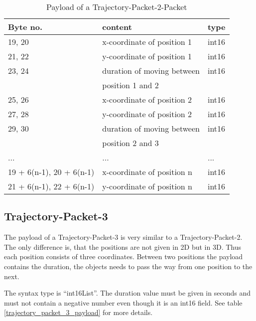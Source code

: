\begin{table}[htdp]
 \begin{center}
    \begin{tabular}{l|l|l}
      \textbf{Byte no.} & \textbf{content} & \textbf{type} \\
      \hline
      \hline
      19, 20 & x-coordinate of position 1 & int16 \\
      \hline
      21, 22 & y-coordinate of position 1 & int16 \\
      \hline
      23, 24 & duration of moving between & int16\\
      & position 1 and 2 & \\
      \hline
      25, 26 & x-coordinate of position 2 & int16 \\
      \hline
      27, 28 & y-coordinate of position 2 & int16 \\
      \hline
      29, 30 & duration of moving between & int16 \\
      &  position 2 and 3 & \\
      \hline
      ... & ... & ... \\
      \hline
      19 + 6(n-1), 20 + 6(n-1) & x-coordinate of position n & int16 \\
      \hline
      21 + 6(n-1), 22 + 6(n-1) & y-coordinate of position n & int16 \\
      \hline
    \end{tabular}
    \caption{Payload of a Trajectory-Packet-2-Packet}
    \label{trajectory_packet_2_payload}
  \end{center}
\end{table}

\subsection{Trajectory-Packet-3}
\label{subsection:trajectory3d}

The payload of a Trajectory-Packet-3 is very similar to a Trajectory-Packet-2. The only difference is, that the positions
are not given in 2D but in 3D. Thus each position consists of three coordinates. Between two positions the payload contains
the duration, the objects needs to pass the way from one position to the next.

The syntax type is ``int16List''. The duration value must be given in seconds and must not contain a negative number
even though it is an int16 field. See table \ref{trajectory_packet_3_payload} for more details.


